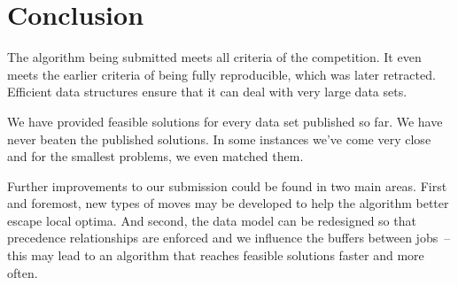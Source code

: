 \documentclass[draft]{svjour3}
\begin{document}
\section{Conclusion}

The algorithm being submitted meets all criteria of the competition. It even meets the earlier criteria of being fully reproducible, which was later retracted. Efficient data structures ensure that it can deal with very large data sets.

We have provided feasible solutions for every data set published so far. We have never beaten the published solutions. In some instances we've come very close and for the smallest problems, we even matched them.

Further improvements to our submission could be found in two main areas. First and foremost, new types of moves may be developed to help the algorithm better escape local optima. And second, the data model can be redesigned so that precedence relationships are enforced and we influence the buffers between jobs~-- this may lead to an algorithm that reaches feasible solutions faster and more often.
\end{document}
